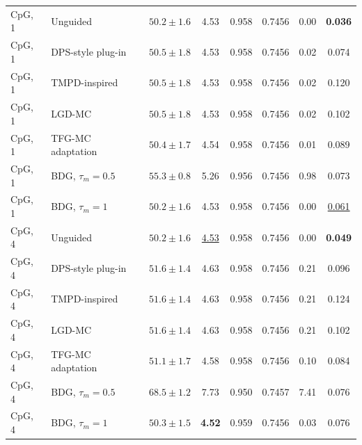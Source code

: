 \documentclass{article}
\begin{document}
\begin{table}[!htbp]
\begin{tabular}{llcccccc}
\midrule
CpG, 1 & Unguided & $50.2\pm1.6$ & 4.53 & 0.958 & 0.7456 & 0.00 & \textbf{0.036}\\
CpG, 1 & DPS-style plug-in & $50.5\pm1.8$ & 4.53 & 0.958 & 0.7456 & 0.02 & 0.074\\
CpG, 1 & TMPD-inspired & $50.5\pm1.8$ & 4.53 & 0.958 & 0.7456 & 0.02 & 0.120\\
CpG, 1 & LGD-MC & $50.5\pm1.8$ & 4.53 & 0.958 & 0.7456 & 0.02 & 0.102\\
CpG, 1 & TFG-MC adaptation & $50.4\pm1.7$ & 4.54 & 0.958 & 0.7456 & 0.01 & 0.089\\
CpG, 1 & BDG, $\tau_m=0.5$ & $\mathbf{55.3\pm0.8}$& 5.26 & 0.956 & 0.7456 & 0.98 & 0.073\\
CpG, 1 & BDG, $\tau_m=1$ & $50.2\pm1.6$ & 4.53 & 0.958 & 0.7456 & 0.00 & \underline{0.061}\\
\midrule
CpG, 4 & Unguided & $50.2\pm1.6$ & \underline{4.53}& 0.958 & 0.7456 & 0.00 & \textbf{0.049}\\
CpG, 4 & DPS-style plug-in & $51.6\pm1.4$ & 4.63 & 0.958 & 0.7456 & 0.21 & 0.096\\
CpG, 4 & TMPD-inspired & $51.6\pm1.4$ & 4.63 & 0.958 & 0.7456 & 0.21 & 0.124\\
CpG, 4 & LGD-MC & $51.6\pm1.4$ & 4.63 & 0.958 & 0.7456 & 0.21 & 0.102\\
CpG, 4 & TFG-MC adaptation & $51.1\pm1.7$ & 4.58 & 0.958 & 0.7456 & 0.10 & 0.084\\
CpG, 4 & BDG, $\tau_m=0.5$ & $\mathbf{68.5\pm1.2}$& 7.73 & 0.950 & 0.7457 & 7.41 & 0.076\\
CpG, 4 & BDG, $\tau_m=1$ & $50.3\pm1.5$ & \textbf{4.52}& 0.959 & 0.7456 & 0.03 & 0.076\\
\bottomrule
\end{tabular}
\end{table}
\end{document}
